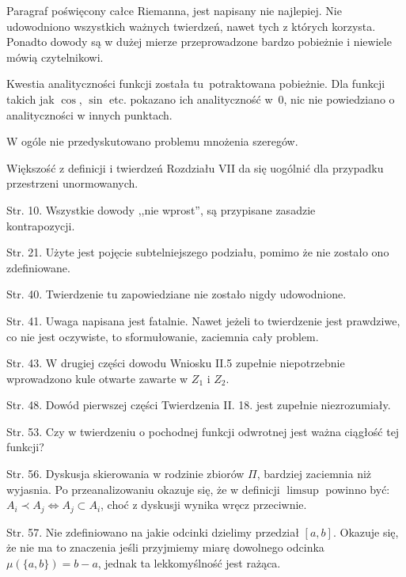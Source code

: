 \vspace{\spaceFour}


\start Paragraf poświęcony całce Riemanna, jest napisany nie
najlepiej. Nie udowodniono wszystkich ważnych twierdzeń, nawet tych z
których korzysta. Ponadto dowody są w dużej mierze przeprowadzone
bardzo pobieżnie i niewiele mówią czytelnikowi.


\start Kwestia analityczności funkcji została tu~potraktowana
pobieżnie. Dla funkcji takich jak $\cos$, $\sin$ etc. pokazano ich
analityczność w~0, nic nie powiedziano o analityczności w innych
punktach.

\vspace{\spaceFour}


\start W ogóle nie przedyskutowano problemu mnożenia szeregów.


\start Większość z definicji i twierdzeń Rozdziału VII da się uogólnić
dla przypadku przestrzeni unormowanych.

\start Str. 10. Wszystkie dowody ,,nie wprost'', są przypisane
zasadzie \\ kontrapozycji.

\start Str. 21. Użyte jest pojęcie subtelniejszego podziału, pomimo że
nie zostało ono zdefiniowane.

\start Str. 40. Twierdzenie tu zapowiedziane nie zostało nigdy
udowodnione.


\start Str. 41. Uwaga napisana jest fatalnie. Nawet jeżeli to
twierdzenie jest prawdziwe, co nie jest oczywiste, to sformułowanie,
zaciemnia cały problem.

\start Str. 43. W drugiej części dowodu Wniosku II.5 zupełnie
niepotrzebnie wprowadzono kule otwarte zawarte w $Z_{ 1 }$ i
$Z_{ 2 }$.

\start Str. 48. Dowód pierwszej części Twierdzenia II. 18. jest
zupełnie niezrozumiały.

\start Str. 53. Czy w twierdzeniu o pochodnej funkcji odwrotnej jest
ważna ciągłość tej funkcji?

\start Str. 56. Dyskusja skierowania w rodzinie zbiorów $\Pi$,
bardziej zaciemnia niż wyjasnia. Po przeanalizowaniu okazuje się, że w
definicji $\limsup$ powinno być: \\
$A_{ i } \prec A_{ j }\Leftrightarrow A_{ j } \subset A_{ i }$, choć z
dyskusji wynika wręcz przeciwnie.

\start Str. 57. Nie zdefiniowano na jakie odcinki dzielimy przedział
$[ a, b ]$. Okazuje się, że nie ma to znaczenia jeśli przyjmiemy miarę
dowolnego odcinka $\mu ( \{ a, b \} ) = b - a$, jednak ta
lekkomyślność jest rażąca.


